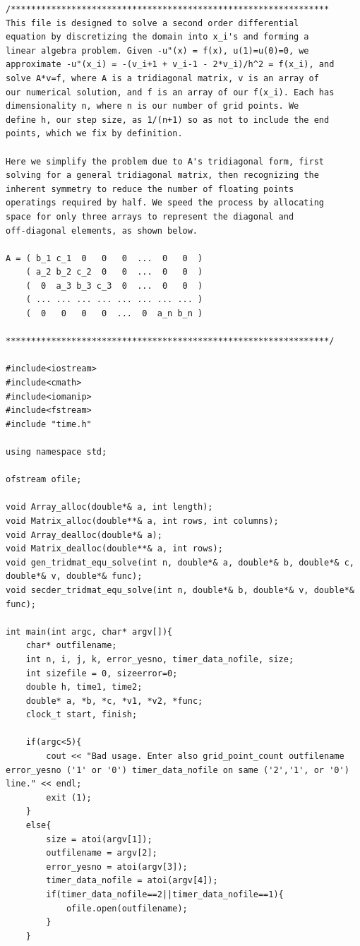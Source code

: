 \documentclass[11pt,a4paper]{article}
\begin{document}
\begin{lstlisting}[title={tridiag.cpp}]
/***************************************************************
This file is designed to solve a second order differential
equation by discretizing the domain into x_i's and forming a 
linear algebra problem. Given -u"(x) = f(x), u(1)=u(0)=0, we 
approximate -u"(x_i) = -(v_i+1 + v_i-1 - 2*v_i)/h^2 = f(x_i), and 
solve A*v=f, where A is a tridiagonal matrix, v is an array of 
our numerical solution, and f is an array of our f(x_i). Each has 
dimensionality n, where n is our number of grid points. We 
define h, our step size, as 1/(n+1) so as not to include the end 
points, which we fix by definition.

Here we simplify the problem due to A's tridiagonal form, first
solving for a general tridiagonal matrix, then recognizing the 
inherent symmetry to reduce the number of floating points 
operatings required by half. We speed the process by allocating 
space for only three arrays to represent the diagonal and 
off-diagonal elements, as shown below. 

A = ( b_1 c_1  0   0   0  ...  0   0  )
    ( a_2 b_2 c_2  0   0  ...  0   0  )
    (  0  a_3 b_3 c_3  0  ...  0   0  )
    ( ... ... ... ... ... ... ... ... )
    (  0   0   0   0  ...  0  a_n b_n )

****************************************************************/

#include<iostream>
#include<cmath>
#include<iomanip>
#include<fstream>
#include "time.h"

using namespace std;

ofstream ofile;

void Array_alloc(double*& a, int length);
void Matrix_alloc(double**& a, int rows, int columns);
void Array_dealloc(double*& a);
void Matrix_dealloc(double**& a, int rows);
void gen_tridmat_equ_solve(int n, double*& a, double*& b, double*& c, double*& v, double*& func);
void secder_tridmat_equ_solve(int n, double*& b, double*& v, double*& func);

int main(int argc, char* argv[]){
	char* outfilename;
	int n, i, j, k, error_yesno, timer_data_nofile, size;
	int sizefile = 0, sizeerror=0;
	double h, time1, time2;
	double* a, *b, *c, *v1, *v2, *func;
	clock_t start, finish;

	if(argc<5){
		cout << "Bad usage. Enter also grid_point_count outfilename error_yesno ('1' or '0') timer_data_nofile on same ('2','1', or '0') line." << endl;
		exit (1);
	}
	else{
		size = atoi(argv[1]);
		outfilename = argv[2];
		error_yesno = atoi(argv[3]);
		timer_data_nofile = atoi(argv[4]);
		if(timer_data_nofile==2||timer_data_nofile==1){
			ofile.open(outfilename);
		}
	}


\end{lstlisting}
\end{document}
